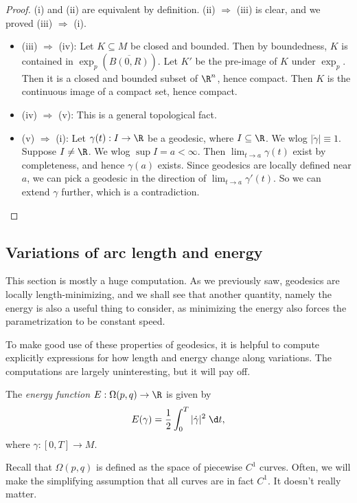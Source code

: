 \documentclass[a4paper]{article}
\begin{document}
\begin{proof}
  (i) and (ii) are equivalent by definition. (ii) $\Rightarrow$ (iii) is clear, and we proved (iii) $\Rightarrow$ (i).

  \begin{itemize}
    \item (iii) $\Rightarrow$ (iv): Let $K \subseteq M$ be closed and bounded. Then by boundedness, $K$ is contained in $\exp_p(\overline{B(0, R)})$. Let $K'$ be the pre-image of $K$ under $\exp_p$. Then it is a closed and bounded subset of $\R^n$, hence compact. Then $K$ is the continuous image of a compact set, hence compact.
    \item (iv) $\Rightarrow$ (v): This is a general topological fact.
    \item (v) $\Rightarrow$ (i): Let $\gamma(t): I \to \R$ be a geodesic, where $I \subseteq \R$. We wlog $|\dot{\gamma}| \equiv 1$. Suppose $I \not= \R$. We wlog $\sup I = a < \infty$. Then $\lim_{t \to a} \gamma(t)$ exist by completeness, and hence $\gamma(a)$ exists. Since geodesics are locally defined near $a$, we can pick a geodesic in the direction of $\lim_{t \to a} \gamma'(t)$. So we can extend $\gamma$ further, which is a contradiction.
  \end{itemize}
\end{proof}

\subsection{Variations of arc length and energy}
This section is mostly a huge computation. As we previously saw, geodesics are locally length-minimizing, and we shall see that another quantity, namely the energy is also a useful thing to consider, as minimizing the energy also forces the parametrization to be constant speed.

To make good use of these properties of geodesics, it is helpful to compute explicitly expressions for how length and energy change along variations. The computations are largely uninteresting, but it will pay off.

\begin{defi}[Energy]
  The \emph{energy function} $E: \Omega(p, q) \to \R$ is given by
  \[
    E(\gamma) = \frac{1}{2} \int_0^T|\dot{\gamma}|^2\;\d t,
  \]
  where $\gamma: [0, T] \to M$.
\end{defi}
Recall that $\Omega(p, q)$ is defined as the space of piecewise $C^1$ curves. Often, we will make the simplifying assumption that all curves are in fact $C^1$. It doesn't really matter.
\end{document}
